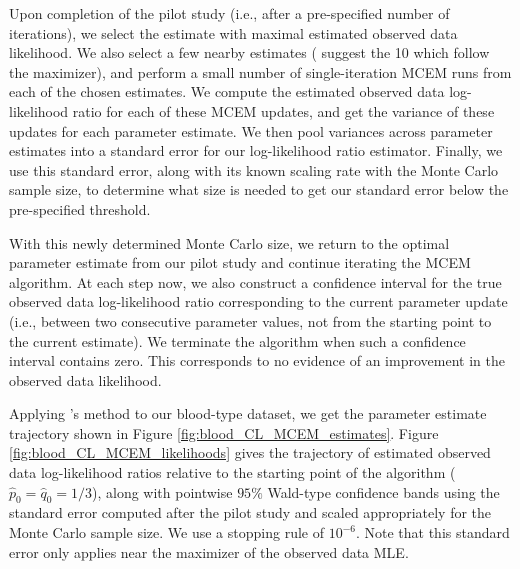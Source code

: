 \documentclass[11pt, oneside]{article}   	%
\begin{document}

Upon completion of the pilot study (i.e., after a pre-specified number of iterations), we select the estimate with maximal estimated observed data likelihood. We also select a few nearby estimates (\citeauthor{Cha95} suggest the 10 which follow the maximizer), and perform a small number of single-iteration MCEM runs from each of the chosen estimates. We compute the estimated observed data log-likelihood ratio for each of these MCEM updates, and get the variance of these updates for each parameter estimate. We then pool variances across parameter estimates into a standard error for our log-likelihood ratio estimator. Finally, we use this standard error, along with its known scaling rate with the Monte Carlo sample size\footnotemark, to determine what size is needed to get our standard error below the pre-specified threshold.


With this newly determined Monte Carlo size, we return to the optimal parameter estimate from our pilot study and continue iterating the MCEM algorithm. At each step now, we also construct a confidence interval for the true observed data log-likelihood ratio corresponding to the current parameter update (i.e., between two consecutive parameter values, not from the starting point to the current estimate). We terminate the algorithm when such a confidence interval contains zero. This corresponds to no evidence of an improvement in the observed data likelihood.

Applying \citeauthor{Cha95}'s method to our blood-type dataset, we get the parameter estimate trajectory shown in Figure \ref{fig:blood_CL_MCEM_estimates}. Figure \ref{fig:blood_CL_MCEM_likelihoods} gives the trajectory of estimated observed data log-likelihood ratios relative to the starting point of the algorithm ($\hat{p}_0 = \hat{q}_0 = 1/3$), along with pointwise $95\%$ Wald-type confidence bands using the standard error computed after the pilot study and scaled appropriately for the Monte Carlo sample size. We use a stopping rule of $10^{-6}$. Note that this standard error only applies near the maximizer of the observed data MLE.
\end{document}
